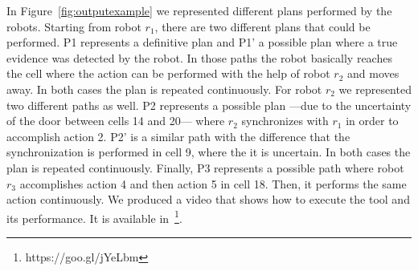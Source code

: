 In Figure~\ref{fig:outputexample} we represented different plans performed by the robots. 
Starting from robot $r_1$, there are two different plans that could be performed.
P1 represents a definitive plan and P1' a possible plan where a true evidence was detected by the robot.
In those paths the robot basically reaches the cell where the action can be performed with the help of robot $r_2$ and moves away. 
In both cases the plan is repeated continuously.
For robot $r_2$ we represented two different paths as well.
P2 represents a possible plan ---due to the uncertainty of the door between cells 14 and 20--- where $r_2$ synchronizes with $r_1$ in order to accomplish action 2.
P2' is a similar path with the difference that the synchronization is performed in cell 9, where the it is uncertain.
In both cases the plan is repeated continuously.
Finally, P3 represents a possible path where robot $r_3$ accomplishes action 4 and then action 5 in cell 18.
Then, it performs the same action continuously.
We produced a video that shows how to execute the tool and its performance. 
It is available in~\footnote{https://goo.gl/jYeLbm}.




